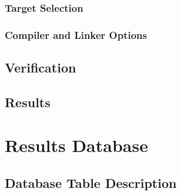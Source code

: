 \documentclass[twoside,11pt]{cergdoc}
\begin{document}
    \subsection{Target Selection}
    \subsection{Compiler and Linker Options}
  \section{Verification}
  \section{Results}

\chapter{Results Database}

\begin{appendix}
\chapter{Database Table Description}
\end{appendix}
\end{document}
